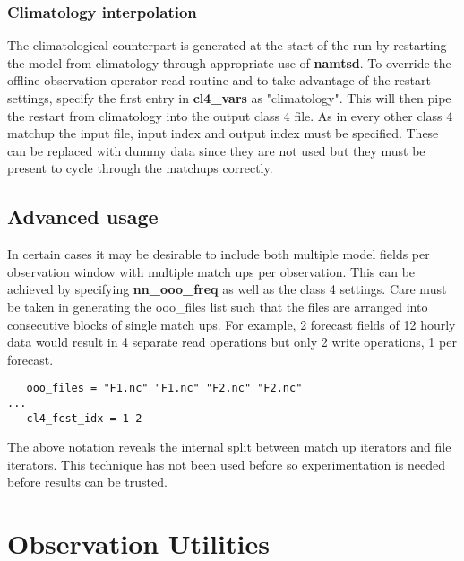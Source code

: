 \documentclass[NEMO_book]{subfiles}
\begin{document}
\subsubsection{Climatology interpolation}

The climatological counterpart is generated at the start of the run by restarting 
the model from climatology through appropriate use of \textbf{namtsd}. To override
the offline observation operator read routine and to take advantage of the restart
settings, specify the first entry in \textbf{cl4\_vars} as "climatology". This will then
pipe the restart from climatology into the output class 4 file. As in every other
class 4 matchup the input file, input index and output index must be specified.
These can be replaced with dummy data since they are not used but they must be
present to cycle through the matchups correctly. 

\subsection{Advanced usage}

In certain cases it may be desirable to include both multiple model fields per
observation window with multiple match ups per observation. This can be achieved
by specifying \textbf{nn\_ooo\_freq} as well as the class 4 settings. Care must
be taken in generating the ooo\_files list such that the files are arranged into
consecutive blocks of single match ups. For example, 2 forecast fields 
of 12 hourly data would result in 4 separate read operations but only 2 write
operations, 1 per forecast.

\begin{alltt}
\tiny
\begin{verbatim}
   ooo_files = "F1.nc" "F1.nc" "F2.nc" "F2.nc"
...
   cl4_fcst_idx = 1 2
\end{verbatim}
\end{alltt}

The above notation reveals the internal split between match up iterators and file
iterators. This technique has not been used before so experimentation is needed
before results can be trusted.




\newpage

\section{Observation Utilities}
\label{OBS_obsutils}
\end{document}
